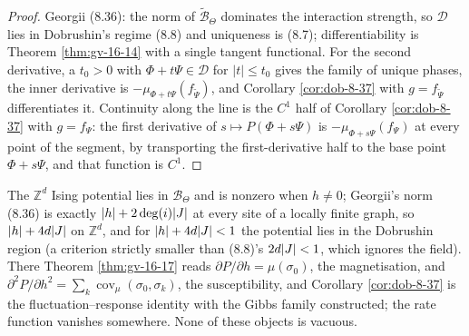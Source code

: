 \begin{proof}
    \leanok
    Georgii (8.36): the norm of $\widetilde{\mathcal B}_\Theta$ dominates the interaction strength,
    so $\mathcal D$ lies in Dobrushin's regime (8.8) and uniqueness is (8.7); differentiability is
    Theorem \ref{thm:gv-16-14} with a single tangent functional. For the second derivative, a
    $t_0 > 0$ with $\Phi + t\Psi \in \mathcal D$ for $|t| \leq t_0$ gives the family of unique
    phases, the inner derivative is $-\mu_{\Phi+t\Psi}(f_{\tilde\Psi})$, and Corollary
    \ref{cor:dob-8-37} with $g = f_{\tilde\Psi}$ differentiates it. Continuity along the line is
    the $C^1$ half of Corollary \ref{cor:dob-8-37} with $g = f_\Psi$: the first derivative of
    $s \mapsto P(\Phi + s\Psi)$ is $-\mu_{\Phi+s\Psi}(f_\Psi)$ at every point of the segment,
    by transporting the first-derivative half to the base point $\Phi + s\Psi$, and that
    function is $C^1$.
\end{proof}

\begin{example}
    \label{ex:gv-ising-witness}
    \leanok

    The $\mathbb Z^d$ Ising potential lies in $\mathcal B_\Theta$ and is nonzero when $h \neq 0$;
    Georgii's norm (8.36) is exactly $\lvert h\rvert + 2\deg(i)\lvert J\rvert$ at every site of a locally finite
    graph, so $\lvert h\rvert + 4d\lvert J\rvert$ on $\mathbb Z^d$, and for $\lvert h\rvert + 4d\lvert J\rvert < 1$ the potential
    lies in the Dobrushin region (a criterion strictly smaller than (8.8)'s $2d\lvert J\rvert < 1$, which
    ignores the field). There Theorem \ref{thm:gv-16-17} reads $\partial P/\partial h =
    \mu(\sigma_0)$, the magnetisation, and $\partial^2 P/\partial h^2 = \sum_k
    \operatorname{cov}_\mu(\sigma_0, \sigma_k)$, the susceptibility, and Corollary
    \ref{cor:dob-8-37} is the fluctuation--response identity with the Gibbs family constructed;
    the rate function vanishes somewhere. None of these objects is vacuous.
\end{example}
